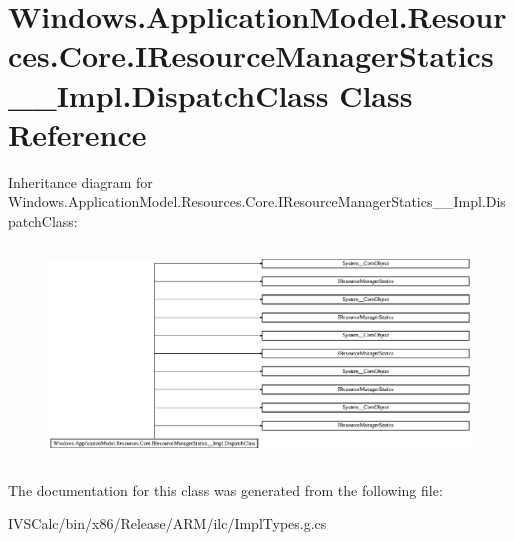 \hypertarget{class_windows_1_1_application_model_1_1_resources_1_1_core_1_1_i_resource_manager_statics_____impl_1_1_dispatch_class}{}\section{Windows.\+Application\+Model.\+Resources.\+Core.\+I\+Resource\+Manager\+Statics\+\_\+\+\_\+\+Impl.\+Dispatch\+Class Class Reference}
\label{class_windows_1_1_application_model_1_1_resources_1_1_core_1_1_i_resource_manager_statics_____impl_1_1_dispatch_class}
Inheritance diagram for Windows.\+Application\+Model.\+Resources.\+Core.\+I\+Resource\+Manager\+Statics\+\_\+\+\_\+\+Impl.\+Dispatch\+Class\+:\begin{figure}[H]
\begin{center}
\leavevmode
\includegraphics[height=5.735568cm]{class_windows_1_1_application_model_1_1_resources_1_1_core_1_1_i_resource_manager_statics_____impl_1_1_dispatch_class}
\end{center}
\end{figure}


The documentation for this class was generated from the following file\+:\begin{DoxyCompactItemize}
\item 
I\+V\+S\+Calc/bin/x86/\+Release/\+A\+R\+M/ilc/Impl\+Types.\+g.\+cs\end{DoxyCompactItemize}
